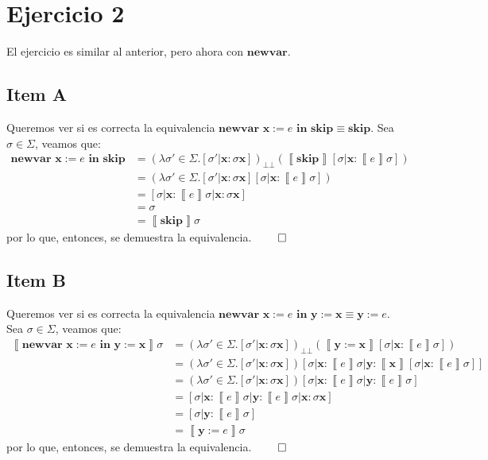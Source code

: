 \documentclass{article}
\newcommand{\sem}[1]{\left\llbracket #1\right\rrbracket}
\newcommand{\x}{\textbf{x}}
\newcommand{\y}{\textbf{y}}
\newcommand{\bbot}{\bot\!\!\!\bot}
\newcommand{\cskip}{\textbf{skip}}
\newcommand{\cnewvar}[3]{\textbf{newvar }#1 := #2\textbf{ in }#3}
\begin{document}
\section*{Ejercicio 2}
El ejercicio es similar al anterior, pero ahora con $\textbf{newvar}$.

\subsection*{Item A}
Queremos ver si es correcta la equivalencia $\cnewvar{\x}{e}{\cskip} \equiv \cskip$.
Sea $\sigma \in \Sigma$, veamos que:
\begin{equation*}
  \begin{aligned}
    \cnewvar{\x}{e}{\cskip} &= (\lambda \sigma' \in \Sigma . [\sigma' | \x : \sigma \x])_{\bbot}(\sem{\cskip}[\sigma | \x : \sem{e}\sigma]) \\ 
                            &= (\lambda \sigma' \in \Sigma . [\sigma' | \x : \sigma \x][\sigma | \x : \sem{e}\sigma]) \\ 
                            &= [\sigma | \x : \sem{e}\sigma | \x : \sigma \x] \\ 
                            &= \sigma \\ 
                            &= \sem{\cskip}\sigma
  \end{aligned}
\end{equation*}
por lo que, entonces, se demuestra la equivalencia. $\qed$

\subsection*{Item B}
Queremos ver si es correcta la equivalencia $\cnewvar{\x}{e}{\y := \x} \equiv \y := e$.
Sea $\sigma \in \Sigma$, veamos que:
\begin{equation*}
  \begin{aligned}
    \sem{\cnewvar{\x}{e}{\y := \x}}\sigma &= (\lambda \sigma' \in \Sigma . [\sigma' | \x : \sigma \x])_{\bbot}(\sem{\y := \x}[\sigma | \x : \sem{e}\sigma]) \\ 
                                          &= (\lambda \sigma' \in \Sigma . [\sigma' | \x : \sigma \x])[\sigma | \x : \sem{e}\sigma | \y : \sem{\x}[\sigma | \x : \sem{e}\sigma]] \\ 
                                          &= (\lambda \sigma' \in \Sigma . [\sigma' | \x : \sigma \x])[\sigma | \x : \sem{e}\sigma | \y : \sem{e}\sigma] \\
                                          &= [\sigma | \x : \sem{e}\sigma | \y : \sem{e}\sigma | \x : \sigma \x] \\ 
                                          &= [\sigma | \y : \sem{e}\sigma] \\ 
                                          &= \sem{\y := e}\sigma
  \end{aligned}
\end{equation*}
por lo que, entonces, se demuestra la equivalencia. $\qed$
\end{document}
